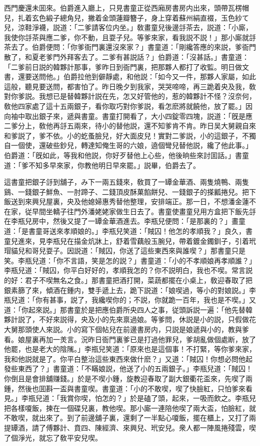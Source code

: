 西門慶還未囬來。伯爵進入廳上，只見書童正從西廂房書房内出來，頭帶瓦楞帽兒，扎着玄色緞子總角兒，撇着金頭蓮瓣簪子，身上穿着蘇州絹直裰，玉色紗て兒，涼鞋淨襪，説道：「二爹請客位内坐。」敎畫童兒後邊㧱茶去，説道：「小廝，我使你㧱茶與應二爹，你不動，且耍子兒。等爹來家，看我説不説！」那小廝就㧱茶去了。伯爵便問：「你爹衙門裏還沒來家？」書童道：「剛纔答應的來説，爹衙門散了，和夏老爹門外拜客去了。二爹有甚説話？」伯爵道：「沒甚話。」書童道：「二爹前日説的韓夥計那事，爹昨日到衙門裏，把那夥人都打了收監。明日做文書，還要送問他。」伯爵拉他到僻靜處，和他説：「如今又一件，那夥人家屬，如此這般，聽見要送問，都害怕了。昨日晚夕到我家，哭哭啼啼，再三跪着央及我，敎對你爹説。我想已是替韓夥計説在先，怎又好管他的，惹的韓夥計不怪？沒奈何，敎他四家處了這十五兩銀子，看你取巧對你爹説，看怎麽將就饒他，放了罷。」因向袖中取出銀子來，遞與書童。書童打開看了，大小四錠零四塊，説道：「旣是應二爹分上，敎他再㧱五兩來，待小的替他説，還不知爹肯不肯。昨日吴大舅親自來和爹説了，爹不依。小的虼蚤臉兒，好大面皮兒！實對二爹説，小的這銀子，不獨自一個使，還破些鈔兒，轉達知俺生哥的六娘，遶個彎兒替他説，纔了他此事。」伯爵道：「旣如此，等我和他説，你好歹替他上心些，他後晌些來討囬話。」書童道：「爹不知多早來家，你教他明日早來罷。」説畢，伯爵去了。

這書童把銀子㧱到舖子，み下一兩五錢來，敎買了一罈金華酒、兩隻燒鴨、兩隻鷄、一錢銀子鮮魚、一肘蹄子、二錢頂皮酥菓餡餅兒、一錢銀子的搽瓤捲兒。把下飯送到來興兒屋裏，央及他媳婦惠秀替他整理，安排端正。那一日，不想潘金蓮不在家，従早間坐轎子往門外潘姥姥家做生日去了。書童使畫童兒用方盒把下飯先㧱在李瓶兒房中，然後又提了一罈金華酒進去。李瓶兒便問：「是那裏的？」畫童道：「是書童哥送來孝順娘的。」李瓶兒笑道：「賊囚！他怎的孝順我？」良久，書童兒進來，見李瓶兒在描金炕牀上，舒着雪藕般玉腕兒，帶着鍍金鐲釧子，引着玳瑁貓兒和哥兒耍子。因説道：「賊囚，你送了這些東西來與誰喫？」那書童只是笑。李瓶兒道：「你不言語，笑是怎的説？」書童道：「小的不孝順娘再孝順誰？」李瓶兒道：「賊囚，你平白好好的，孝順我怎的？你不説明白，我也不喫。常言説的好：君子不喫無名之食。」那書童把酒打開，菜蔬都擺在小桌上，敎迎春取了把銀素篩了來，傾酒在鍾内，雙手遞上去，跪下説道：「娘喫過，等小的對娘説。」李瓶兒道：「你有甚事，説了，我纔喫你的；不説，你就跪一百年，我也是不喫。」又道：「你起來説。」那書童於是把應伯爵所央四人之事，従頭訴説一遍：「他先替韓夥計説了，不好來説得，央及小的先來禀過娘。等爹問，休説是小的説，只假做花大舅那頭使人來説。小的寫下個帖兒在前邊書房内，只説是娘遞與小的，教與爹看。娘屋裏再加一羙言。況昨日衙門裏爹已是打過他罪兒，爹胡亂做個處断，放了他罷，也是老大的陰隲。」李瓶兒笑道：「原來也是這個事！不打緊，等你爹來家，我和他説就是了。你平白整治這些東西來做什麽？」又道：「賊囚！你想必問他起發些東西了？」書童道：「不瞞娘説，他送了小的五兩銀子。」李瓶兒道：「賊囚！你倒且是會排舖赚錢。」於是不喫小鍾，旋教迎春取了副大銀衢花盃來，先喫了兩鍾，然後也囬斟一盃與書童喫。書童道：「小的不敢喫，喫了快臉紅，只怕爹來看見。」李瓶兒道：「我賞你喫，怕怎的？」於是磕了頭，起來，一吸而飲之。李瓶兒把各樣嗄飯，揀在一個碟兒裏，教他喫。那小廝一連陪他喫了兩大盃，怕臉紅，就不敢喫，就出來了。到了前邊舖子裏，還剩了一半點心嗄飯，擺在櫃上，又打了兩提罈酒，請了傅夥計、賁四、陳經濟、來興兒、玳安兒。衆人都一陣風捲殘雲，喫了個淨光，就忘了敎平安兒喫。

